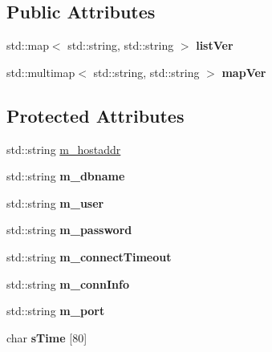 \subsection*{Public Attributes}
\begin{DoxyCompactItemize}
\item 
\hypertarget{classDatabase_a15b316cae6fa42bd196fe02604d6885f}{
std::map$<$ std::string, std::string $>$ {\bfseries listVer}}
\label{classDatabase_a15b316cae6fa42bd196fe02604d6885f}

\item 
\hypertarget{classDatabase_a5d3b8a26bb76c91209970d278cb0faec}{
std::multimap$<$ std::string, std::string $>$ {\bfseries mapVer}}
\label{classDatabase_a5d3b8a26bb76c91209970d278cb0faec}

\end{DoxyCompactItemize}
\subsection*{Protected Attributes}
\begin{DoxyCompactItemize}
\item 
std::string \hyperlink{classDatabase_a73a3ea4197118649af11db64a0905f26}{m\_\-hostaddr}
\item 
\hypertarget{classDatabase_a70b977fa3e19a4246e7db483dcd8761d}{
std::string {\bfseries m\_\-dbname}}
\label{classDatabase_a70b977fa3e19a4246e7db483dcd8761d}

\item 
\hypertarget{classDatabase_a3c452d6af7dbb3a1d43a0af8a52925ca}{
std::string {\bfseries m\_\-user}}
\label{classDatabase_a3c452d6af7dbb3a1d43a0af8a52925ca}

\item 
\hypertarget{classDatabase_a3162a928df727ca310429e7e1898ce2e}{
std::string {\bfseries m\_\-password}}
\label{classDatabase_a3162a928df727ca310429e7e1898ce2e}

\item 
\hypertarget{classDatabase_a011133e8aee26f47cecc85bf23c4172f}{
std::string {\bfseries m\_\-connectTimeout}}
\label{classDatabase_a011133e8aee26f47cecc85bf23c4172f}

\item 
\hypertarget{classDatabase_a694c89f3fbedd3ca436a77879839a741}{
std::string {\bfseries m\_\-connInfo}}
\label{classDatabase_a694c89f3fbedd3ca436a77879839a741}

\item 
\hypertarget{classDatabase_a00d646c476f717ca940a96dd246e198d}{
std::string {\bfseries m\_\-port}}
\label{classDatabase_a00d646c476f717ca940a96dd246e198d}

\item 
\hypertarget{classDatabase_ab85622620a91d68830ee429f0cea4eb9}{
char {\bfseries sTime} \mbox{[}80\mbox{]}}
\label{classDatabase_ab85622620a91d68830ee429f0cea4eb9}

\end{DoxyCompactItemize}


